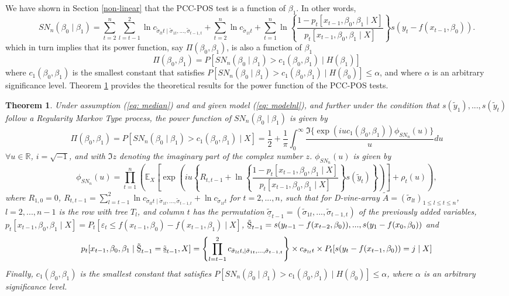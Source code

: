 \documentclass[harvard,11pt]{article}
\newcommand{\E}{\mathbb{E}}
\newtheorem{theorem}{Theorem}
\begin{document}
We have shown in Section \ref{non-linear} that the PCC-POS test is a function of $\beta_1$. In other words,
\[
SN_{n}(\beta_0\mid\beta _{1})=\sum\limits_{t=2}^{n}\sum\limits_{l=t-1}^{2}\ln c_{\tilde{\sigma}_{lt}t\mid \tilde{\sigma}_{1t},...,\tilde{\sigma}_{t-1,t}}+\sum\limits_{t=2}^{n}\ln c_{\tilde{\sigma}_{1t}t}+\sum\limits_{t=1}^{n}\ln\left\{\frac{1-p_t[x_{t-1},\beta_0,\beta_1\mid X]}{p_t[x_{t-1},\beta_0,\beta_1\mid X]}\right\}s(y_t-f(x_{t-1},\beta_0)).
\]
which in turn implies that its power function, say $\Pi(\beta_0,\beta_1)$, is also a function of $\beta_1$
\[
\Pi(\beta_0,\beta_1)=P[SN_{n}(\beta_0\mid\beta _{1})>c_1(\beta_0,\beta_1)\mid H(\beta_1)]
\]
where $c_1(\beta_0,\beta_1)$ is the smallest constant that satisfies $P[SN_n(\beta_0\mid\beta_1)>c_1(\beta_0,\beta_1)\mid H(\beta_0)]\leq \alpha$, and where $\alpha$ is an arbitrary significance level.  Theorem \ref{Theorem1} provides the theoretical results for the power function of the PCC-POS tests.
\begin{theorem}\label{Theorem1} 
Under assumption (\ref{eq: median}) and and given model (\ref{eq: modelnl}), and further under the condition that $s(\tilde{y}_1),...,s(\tilde{y}_t)$ follow a Regularity Markov Type process, the power function of $SN_{n}(\beta_0\mid\beta _{1})$ is given by
\[
\Pi(\beta_0,\beta_1)=P[SN_n(\beta_0\mid \beta_1)> c_1(\beta_0,\beta_1)\mid X]=\frac{1}{2}+\frac{1}{\pi}\int_{0}^{\infty}\frac{\Im\{\exp(iuc_1(\beta_0,\beta_1))\phi_{SN_n}(u)\}}{u}du
\] 
$\forall u \in \mathbb{R}$, $i=\sqrt{-1}$, and with $\Im{z}$ denoting the imaginary part of the complex number $z$. $\phi_{SN_n}(u)$ is given by
\[
\phi_{SN_n}(u)=\prod\limits_{t=1}^{n}\left(\E_X\left[\exp\left(iu\left\{R_{t,t-1}+\ln\left\{\frac{1-p_t[x_{t-1},\beta_0,\beta_1\mid X]}{p_t[x_{t-1},\beta_0,\beta_1\mid X]}\right\}s(\tilde{y}_t)\right\}\right)\right]+\rho_t(u)\right),
\]
where $R_{1,0}=0$, $R_{t,t-1}=\sum\limits_{l=t-1}^{2}\ln c_{\tilde{\sigma}_{lt}t\mid \tilde{\sigma}_{1t},...,\tilde{\sigma}_{t-1,t}}+\ln c_{\tilde{\sigma}_{1t}t}$ for $t=2,...,n$, such that for D-vine-array $\tilde{A}=(\tilde{\sigma}_{lt})_{1\leq l\leq t\leq n}$, $l=2,...,n-1$ is the row with tree $T_l$, and column $t$ has the permutation $\tilde{\underline{\sigma}}_{t-1}=(\tilde{\sigma}_{1t},...,\tilde{\sigma}_{t-1,t})$ of the previously added variables, $p_t[x_{t-1},\beta_0,\beta_1\mid X]=P_t[\varepsilon_t\leq f(x_{t-1},\beta_0)-f(x_{t-1},\beta_1)\mid X]$, $\tilde{\text{\b{S}}}_{t-1}=s(y_{t-1}-f(x_{t-2},\beta_0)),...,s(y_{1}-f(x_{0},\beta_0))$ and 
\[
p_t[x_{t-1},\beta_0,\beta_1\mid \tilde{\text{\b{S}}}_{t-1}=\tilde{\text{\b{s}}}_{t-1},X]=\left\{\prod\limits_{l=t-1}^{2} c_{\tilde{\sigma}_{lt}t,\mid \tilde{\sigma}_{1t},...,\tilde{\sigma}_{t-1,t}}\right\}\times c_{\tilde{\sigma}_{lt}t}\times P_t[s(y_t-f(x_{t-1},\beta_0))=j\mid X]
\]
Finally, $c_1(\beta_0,\beta_1)$ is the smallest constant that satisfies $P[SN_n(\beta_0\mid\beta_1)>c_1(\beta_0,\beta_1)\mid H(\beta_0)]\leq \alpha$, where $\alpha$ is an arbitrary significance level. 
\end{theorem}
\end{document}
